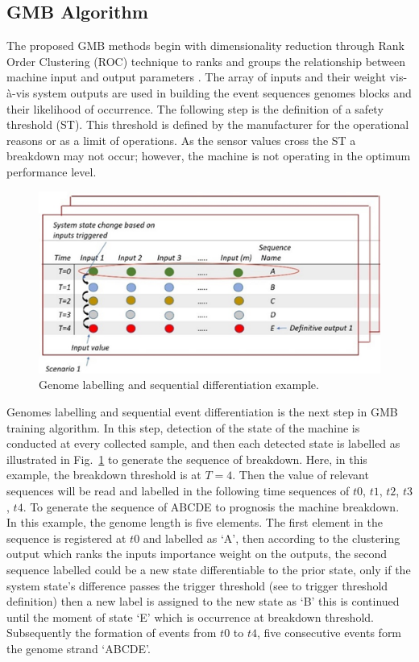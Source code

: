 \documentclass[conference]{IEEEtran}
\begin{document}
\subsection{GMB Algorithm}
\label{subsec:GMB_Algorithm}
The proposed GMB methods begin with dimensionality reduction through Rank Order Clustering (ROC) technique to ranks and groups the relationship between machine input and output parameters \cite{Danishvar2018}. The array of inputs and their weight vis-à-vis system outputs are used in building the event sequences genomes blocks and their likelihood of occurrence. The following step is the definition of a safety threshold (ST). This threshold is defined by the manufacturer for the operational reasons or as a limit of operations. As the sensor values cross the ST a breakdown may not occur; however, the machine is not operating in the optimum performance level.
\begin{figure}[t]
\centerline{\includegraphics[width=0.7\linewidth]{Genome_Labelling.png}}
\caption{Genome labelling and sequential differentiation example.}
\label{fig:Genome_labelling}
\end{figure}
Genomes labelling and sequential event differentiation is the next step in GMB training algorithm. In this step, detection of the state of the machine is conducted at every collected sample, and then each detected state is labelled as illustrated in Fig.~\ref{fig:Genome_labelling} to generate the sequence of breakdown. Here, in this example, the breakdown threshold is at $T = 4$. Then the value of relevant sequences will be read and labelled in the following time sequences of $t0$, $t1$, $t2$, $t3$, $t4$. To generate the sequence of ABCDE to prognosis the machine breakdown. In this example, the genome length is five elements. The first element in the sequence is registered at $t0$ and labelled as `A', then according to the clustering output which ranks the inputs importance weight on the outputs, the second sequence labelled could be a new state differentiable to the prior state, only if the system state's difference passes the trigger threshold (see \cite{Tavakoli2013} to trigger threshold definition) then a new label is assigned to the new state as `B' this is continued until the moment of state `E' which is occurrence at breakdown threshold. Subsequently the formation of events from $t0$ to $t4$, five consecutive events form the genome strand `ABCDE'.
\end{document}
